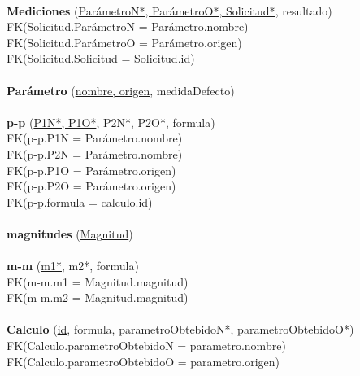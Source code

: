 \documentclass[a4paper,10pt]{article}
\newcommand\tab[1][1cm]{\hspace*{#1}}
\begin{document}
\paragraph{}
{\bf Mediciones} (\underline{ParámetroN*, ParámetroO*, Solicitud*}, resultado)\\
\tab FK(Solicitud.ParámetroN = Parámetro.nombre)\\
\tab FK(Solicitud.ParámetroO = Parámetro.origen)\\
\tab FK(Solicitud.Solicitud = Solicitud.id)

\paragraph{}
{\bf Parámetro} (\underline{nombre, origen}, medidaDefecto)

\paragraph{}
{\bf p-p} (\underline{P1N*, P1O*}, P2N*, P2O*, formula)\\
\tab FK(p-p.P1N = Parámetro.nombre)\\
\tab FK(p-p.P2N = Parámetro.nombre)\\
\tab FK(p-p.P1O = Parámetro.origen)\\
\tab FK(p-p.P2O = Parámetro.origen)\\
\tab FK(p-p.formula = calculo.id)

\paragraph{}
{\bf magnitudes} (\underline{Magnitud})

\paragraph{}
{\bf m-m} (\underline{m1*}, m2*, formula)\\
\tab FK(m-m.m1 = Magnitud.magnitud)\\
\tab FK(m-m.m2 = Magnitud.magnitud)

\paragraph{}
{\bf Calculo} (\underline{id}, formula, parametroObtebidoN*, parametroObtebidoO*)\\
\tab FK(Calculo.parametroObtebidoN = parametro.nombre)\\
\tab FK(Calculo.parametroObtebidoO = parametro.origen)
\end{document}
